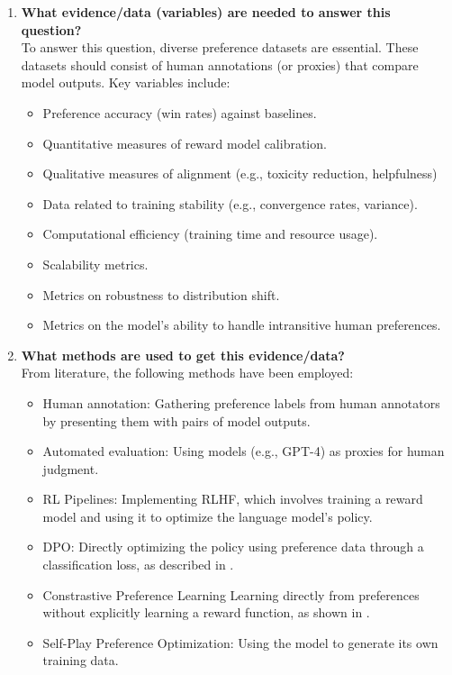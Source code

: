 \documentclass[a4paper,oneside,10pt,ngerman,english]{scrartcl}
\begin{document}
\begin{enumerate}
    \item \textbf{What evidence/data (variables) are needed to answer this question?} \\
    To answer this question, diverse preference datasets are essential. These datasets should consist of human annotations (or proxies) that compare model outputs. Key variables include:
    \begin{itemize}
        \item Preference accuracy (win rates) against baselines.
        \item Quantitative measures of reward model calibration.
        \item Qualitative measures of alignment (e.g., toxicity reduction, helpfulness)
        \item Data related to training stability (e.g., convergence rates, variance).
        \item Computational efficiency (training time and resource usage).
        \item Scalability metrics.
        \item Metrics on robustness to distribution shift. 
        \item Metrics on the model's ability to handle intransitive human preferences. 
    \end{itemize}

    \item \textbf{What methods are used to get this evidence/data?} \\
    From literature, the following methods have been employed: 
    \begin{itemize}
        \item Human annotation: Gathering preference labels from human annotators by presenting them with pairs of model outputs. 
        \item Automated evaluation: Using models (e.g., GPT-4) as proxies for human judgment. 
        \item RL Pipelines: Implementing RLHF, which involves training a reward model and using it to optimize the language model's policy.
        \item  DPO: Directly optimizing the policy using preference data through a classification loss, as described in \cite{bib:Rafailov2023}.
        \item Constrastive Preference Learning Learning directly from preferences without explicitly learning a reward function, as shown in \cite{bib:Zhao2023}.
        \item Self-Play Preference Optimization: Using the model to generate its own training data.
    \end{itemize}


\end{enumerate}
\end{document}
